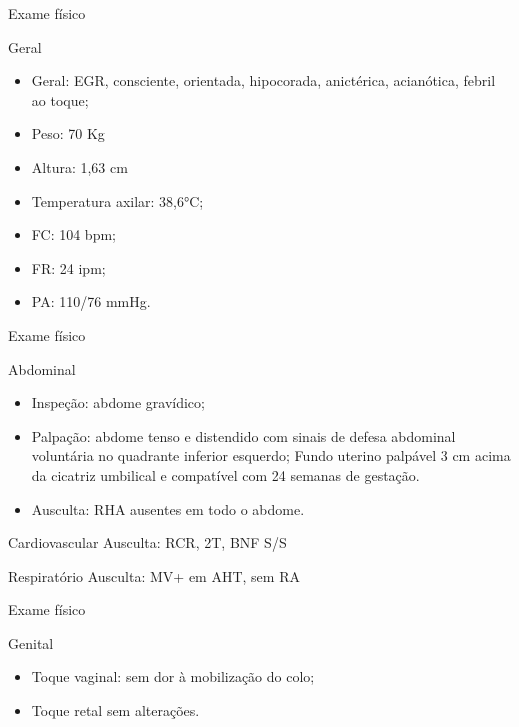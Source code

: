 \begin{frame}{Exame físico}
    \begin{block}{Geral}
        \begin{itemize}
            \item Geral: EGR, consciente, orientada, hipocorada, anictérica, acianótica, febril ao toque;
            \item Peso: 70 Kg
            \item Altura: 1,63 cm
            \item Temperatura axilar: 38,6°C;
            \item FC: 104 bpm;
            \item FR: 24 ipm;
            \item PA: 110/76 mmHg.
        \end{itemize}{}
    \end{block}
\end{frame}

\begin{frame}{Exame físico}
    \begin{block}{Abdominal}
        \begin{itemize}
            \item Inspeção: abdome gravídico;
            \item Palpação: abdome tenso e distendido com sinais de defesa abdominal voluntária no quadrante inferior esquerdo; Fundo uterino palpável 3 cm acima da cicatriz umbilical e compatível com 24 semanas de gestação.
            \item Ausculta: RHA ausentes em todo o abdome.
        \end{itemize}{}
    \end{block}
    \begin{block}{Cardiovascular}
    Ausculta: RCR, 2T, BNF S/S
    \end{block}
    \begin{block}{Respiratório}
    Ausculta: MV+ em AHT, sem RA
    \end{block}
\end{frame}

\begin{frame}{Exame físico}
    \begin{block}{Genital}
        \begin{itemize}
            \item Toque vaginal: sem dor à mobilização do colo;
            \item Toque retal sem alterações.
        \end{itemize}{}
    \end{block}
\end{frame}